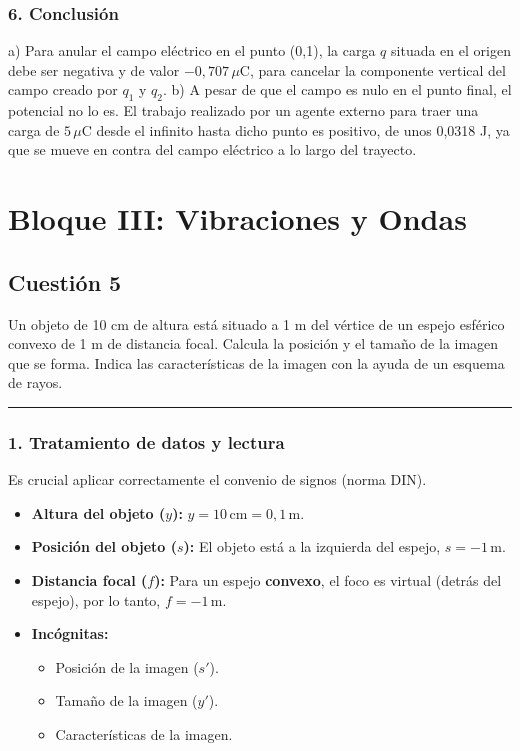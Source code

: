 \subsubsection*{6. Conclusión}
\begin{cajaconclusion}
    a) Para anular el campo eléctrico en el punto (0,1), la carga $q$ situada en el origen debe ser negativa y de valor $-0,707 \, \mu\text{C}$, para cancelar la componente vertical del campo creado por $q_1$ y $q_2$.
    b) A pesar de que el campo es nulo en el punto final, el potencial no lo es. El trabajo realizado por un agente externo para traer una carga de $5 \, \mu\text{C}$ desde el infinito hasta dicho punto es positivo, de unos 0,0318 J, ya que se mueve en contra del campo eléctrico a lo largo del trayecto.
\end{cajaconclusion}

\newpage
\section{Bloque III: Vibraciones y Ondas}
\label{sec:ondas_2024_jul_ext}
\subsection{Cuestión 5}
\label{subsec:C5_2024_jul_ext}

\begin{cajaenunciado}
Un objeto de 10 cm de altura está situado a 1 m del vértice de un espejo esférico convexo de 1 m de distancia focal. Calcula la posición y el tamaño de la imagen que se forma. Indica las características de la imagen con la ayuda de un esquema de rayos.
\end{cajaenunciado}
\hrule

\subsubsection*{1. Tratamiento de datos y lectura}
Es crucial aplicar correctamente el convenio de signos (norma DIN).
\begin{itemize}
    \item \textbf{Altura del objeto ($y$):} $y = 10 \, \text{cm} = 0,1 \, \text{m}$.
    \item \textbf{Posición del objeto ($s$):} El objeto está a la izquierda del espejo, $s = -1 \, \text{m}$.
    \item \textbf{Distancia focal ($f$):} Para un espejo \textbf{convexo}, el foco es virtual (detrás del espejo), por lo tanto, $f = -1 \, \text{m}$.
    \item \textbf{Incógnitas:}
    \begin{itemize}
        \item Posición de la imagen ($s'$).
        \item Tamaño de la imagen ($y'$).
        \item Características de la imagen.
    \end{itemize}
\end{itemize}

